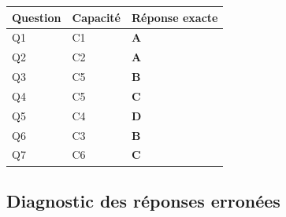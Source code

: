 \begin{center}
\begin{tabular}{lll}
\hline
Question & Capacité & Réponse exacte \\
\hline
Q1 & C1 & \textbf{A} \\
Q2 & C2 & \textbf{A} \\
Q3 & C5 & \textbf{B} \\
Q4 & C5 & \textbf{C} \\
Q5 & C4 & \textbf{D} \\
Q6 & C3 & \textbf{B} \\
Q7 & C6 & \textbf{C} \\
\hline
\end{tabular}
\end{center}

\subsection*{Diagnostic des réponses erronées}

